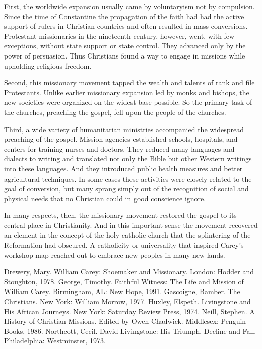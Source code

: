 First, the worldwide expansion usually came by voluntaryism not by compulsion. Since the time of
Constantine the propagation of the faith had had the active support of rulers in Christian countries
and often resulted in mass conversions. Protestant missionaries in the nineteenth century, however,
went, with few exceptions, without state support or state control. They advanced only by the power
of persuasion. Thus Christians found a way to engage in missions while upholding religious freedom.

Second, this missionary movement tapped the wealth and talents of rank and file Protestants. Unlike
earlier missionary expansion led by monks and bishops, the new societies were organized on the
widest base possible. So the primary task of the churches, preaching the gospel, fell upon the
people of the churches.

Third, a wide variety of humanitarian ministries accompanied the widespread preaching of the gospel.
Mission agencies established schools, hospitals, and centers for training nurses and doctors. They
reduced many languages and dialects to writing and translated not only the Bible but other Western
writings into these languages. And they introduced public health measures and better agricultural
techniques. In some cases these activities were closely related to the goal of conversion, but many
sprang simply out of the recognition of social and physical needs that no Christian could in good
conscience ignore.

In many respects, then, the missionary movement restored the gospel to its central place in
Christianity. And in this important sense the movement recovered an element in the concept of the
holy catholic church that the splintering of the Reformation had obscured. A catholicity or
universality that inspired Carey’s workshop map reached out to embrace new peoples in many new
lands.

\begin{readinglist}
\entry Drewery, Mary. William Carey: Shoemaker and Missionary. London: Hodder and Stoughton, 1978.
\entry George, Timothy. Faithful Witness: The Life and Mission of William Carey. Birmingham, AL: New
  Hope, 1991.
\entry Gascoigne, Bamber. The Christians. New York: William Morrow, 1977.
\entry Huxley, Elspeth. Livingstone and His African Journeys. New York: Saturday Review Press, 1974.
\entry Neill, Stephen. A History of Christian Missions. Edited by Owen Chadwick. Middlesex: Penguin
  Books, 1986.
\entry Northcott, Cecil. David Livingstone: His Triumph, Decline and Fall. Philadelphia:
  Westminster, 1973.
\end{readinglist}
